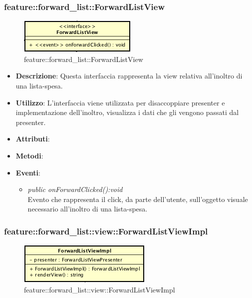 \subsubsection{feature::forward\_list::ForwardListView}

\label{feature::forward\_list::ForwardListView}
\begin{figure}[ht]
	\centering
	\includegraphics[scale=0.5]{Sezioni/SottosezioniST/img/app/ForwardListView.png}
	\caption{feature::forward\_list::ForwardListView}
\end{figure}

\begin{itemize}
\item \textbf{Descrizione}: Questa interfaccia rappresenta la view relativa all'inoltro di una lista-spesa.
\item \textbf{Utilizzo}: L'interfaccia viene utilizzata per disaccoppiare presenter e implementazione dell'inoltro, visualizza i dati che gli vengono passati dal presenter.
\item \textbf{Attributi}: 
\item \textbf{Metodi}:
\item \textbf{Eventi}:
\begin{itemize}
\item \textit{public onForwardClicked():void}\\
	Evento che rappresenta il click, da parte dell'utente, sull'oggetto visuale necessario all'inoltro di una lista-spesa.
\end{itemize}
\end{itemize}

\subsubsection{feature::forward\_list::view::ForwardListViewImpl}

\label{feature::forward\_list::view::ForwardListViewImpl}
\begin{figure}[ht]
	\centering
	\includegraphics[scale=0.5]{Sezioni/SottosezioniST/img/app/ForwardListViewImpl.png}
	\caption{feature::forward\_list::view::ForwardListViewImpl}
\end{figure}

